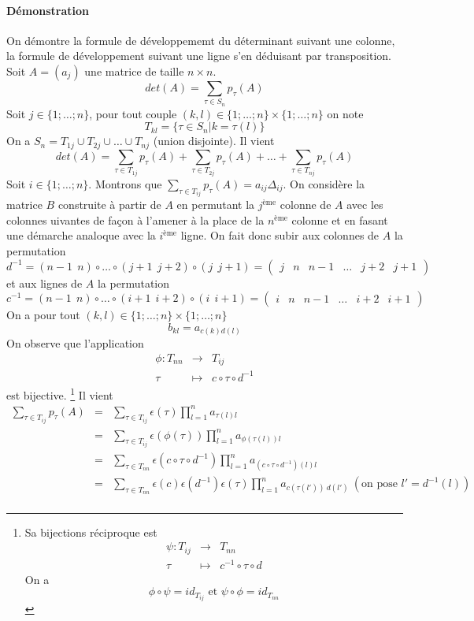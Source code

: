 \paragraph{Démonstration} On démontre la formule de développememt du déterminant suivant une colonne, la formule de développement suivant une ligne s'en déduisant par transposition. \\
Soit $A = (a_{j})$ une matrice de taille $n \times n$.
$$det(A) = \sum_{\tau \in S_n} p_{\tau}(A)$$
Soit $j \in \{1; \ldots; n \}$, pour tout couple $(k, l) \in  \{1; \ldots; n \}\times\{1; \ldots; n \}$ on note
$$T_{kl} = \{\tau \in S_n \vert k = \tau(l) \}$$
On a $S_n = T_{1j} \cup T_{2j} \cup \ldots \cup T_{nj}$ (union disjointe). Il vient
$$det(A) = \sum_{\tau \in T_{1j}} p_{\tau}(A) + \sum_{\tau \in T_{2j}} p_{\tau}(A) + \ldots + \sum_{\tau \in T_{nj}} p_{\tau}(A)$$
Soit $i \in \{1; \ldots; n\}$. Montrons que $\sum_{\tau \in T_{ij}} p_{\tau}(A) = a_{ij} \Delta_{ij}$. On considère la matrice $B$ construite à partir de $A$ en permutant la $j^{\text{ème}}$ colonne de $A$ avec les colonnes uivantes de façon à l'amener à la place de la $n^{\text{ème}}$ colonne et en fasant une démarche analoque avec la $i^{\text{ème}}$ ligne. On fait donc subir aux colonnes de $A$ la permutation
$$d^{-1} = (n-1 ~~ n) \circ \ldots \circ (j+ 1 ~~ j + 2) \circ (j ~~ j+1) = \begin{pmatrix}j & n & n-1 & \ldots & j + 2 & j + 1\end{pmatrix}$$
et aux lignes de $A$ la permutation
$$c^{-1} = (n-1 ~~ n) \circ \ldots \circ (i+ 1 ~~ i + 2) \circ (i ~~ i+1) = \begin{pmatrix}i & n & n-1 & \ldots & i + 2 & i + 1\end{pmatrix}$$
On a pour tout $(k, l) \in \{1; \ldots; n \}\times\{1; \ldots; n \}$
$$b_{kl} = a_{c(k)d(l)}$$
On observe que l'application
\begin{eqnarray*}
  \phi: T_{n n} &\rightarrow& T_{ij} \\
  \tau &\mapsto& c \circ \tau \circ d^{-1}
\end{eqnarray*}
est bijective. \footnote{Sa bijections réciproque est
\begin{eqnarray*}
  \psi: T_{ij} &\rightarrow& T_{n n} \\
  \tau &\mapsto& c^{-1} \circ \tau \circ d
\end{eqnarray*}
On a
$$\phi \circ \psi = id_{T_{ij}} \text{ et } \psi \circ \phi = id_{T_{n n}}$$}
Il vient
\begin{eqnarray*}
  \sum_{\tau \in T_{ij}} p_{\tau}(A) &=& \sum_{\tau \in T_{ij}} \epsilon(\tau) \prod_{l=1}^{n} a_{\tau(l) l} \\
    &=& \sum_{\tau \in T_{ij}} \epsilon(\phi(\tau)) \prod_{l=1}^{n} a_{\phi(\tau(l)) l} \\
    &=& \sum_{\tau \in T_{n n}} \epsilon(c \circ \tau \circ d^{-1}) \prod_{l=1}^{n} a_{(c \circ \tau \circ d^{-1})(l) l} \\
    &=& \sum_{\tau \in T_{n n}} \epsilon(c) \epsilon(d^{-1}) \epsilon(\tau) \prod_{l=1}^{n} a_{c(\tau(l')) ~ d(l')} ~ (\text{on pose } l' = d^{-1}(l))\\
\end{eqnarray*}
